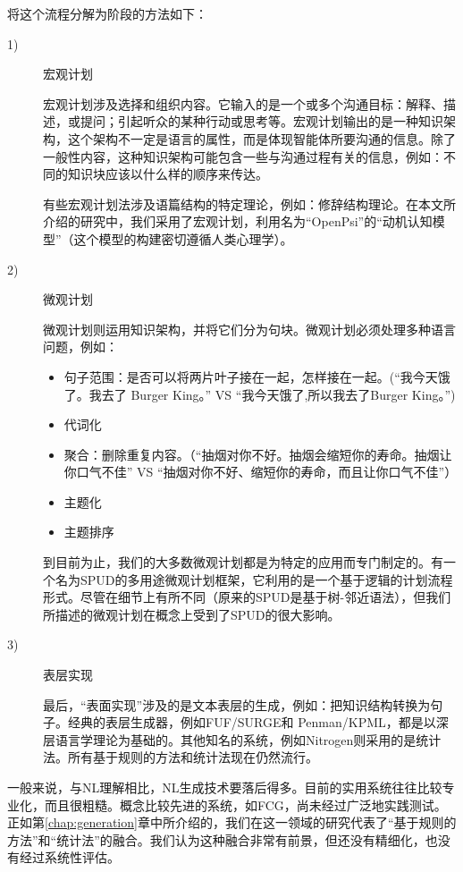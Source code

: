 \begin{enumerate}
将这个流程分解为阶段的方法如下：
\begin{description}

\item [1)] 宏观计划

宏观计划涉及选择和组织内容。它输入的是一个或多个沟通目标：解释、描述，或提问；引起听众的某种行动或思考等。宏观计划输出的是一种知识架构，这个架构不一定是语言的属性，而是体现智能体所要沟通的信息。除了一般性内容，这种知识架构可能包含一些与沟通过程有关的信息，例如：不同的知识块应该以什么样的顺序来传达。

有些宏观计划法涉及语篇结构的特定理论，例如：修辞结构理论\cite{Mann1987}。在本文所介绍的研究中，我们采用了宏观计划，利用名为“OpenPsi”的“动机认知模型”（这个模型的构建密切遵循人类心理学）。

\item [2)] 微观计划

微观计划则运用知识架构，并将它们分为句块。微观计划必须处理多种语言问题，例如：

\begin{itemize}
\item 句子范围：是否可以将两片叶子接在一起，怎样接在一起。(“我今天饿了。我去了 Burger King。” VS “我今天饿了,所以我去了Burger King。”)
\item 代词化
\item 聚合：删除重复内容。（“抽烟对你不好。抽烟会缩短你的寿命。抽烟让你口气不佳” VS “抽烟对你不好、缩短你的寿命，而且让你口气不佳”）
\item 主题化
\item 主题排序
\end{itemize}

到目前为止，我们的大多数微观计划都是为特定的应用而专门制定的。有一个名为SPUD\cite{Stone 1997}的多用途微观计划框架，它利用的是一个基于逻辑的计划流程形式。尽管在细节上有所不同（原来的SPUD是基于树-邻近语法），但我们所描述的微观计划在概念上受到了SPUD的很大影响。

\item [3)] 表层实现

最后，“表面实现”涉及的是文本表层的生成，例如：把知识结构转换为句子。经典的表层生成器，例如FUF/SURGE\cite{Elhadad1992}和 Penman/KPML\cite{Matthiessen1991}，都是以深层语言学理论为基础的。其他知名的系统，例如Nitrogen\cite{Langkilde1998}则采用的是统计法。所有基于规则的方法和统计法现在仍然流行。

\end{description}

一般来说，与NL理解相比，NL生成技术要落后得多。目前的实用系统往往比较专业化，而且很粗糙。概念比较先进的系统，如FCG，尚未经过广泛地实践测试。正如第\ref{chap:generation}章中所介绍的，我们在这一领域的研究代表了“基于规则的方法”和“统计法”的融合。我们认为这种融合非常有前景，但还没有精细化，也没有经过系统性评估。
\end{enumerate}

